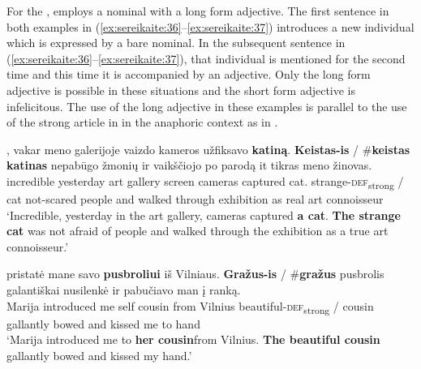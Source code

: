 \documentclass[output=paper,
modfonts
]{langscibook}
\begin{document}
For the ,  employs a nominal with a long form adjective. The first sentence in both examples in (\ref{ex:sereikaite:36}--\ref{ex:sereikaite:37}) introduces a new individual which is expressed by a bare nominal. In the subsequent sentence in (\ref{ex:sereikaite:36}--\ref{ex:sereikaite:37}), that individual is mentioned for the second time and this time it is accompanied by an adjective. Only the long form adjective is possible in these situations and the short form adjective is infelicitous. The use of the long adjective in these examples is parallel to the use of the strong article in  in the anaphoric context as in . 

\begin{exe}
	\ex \label{ex:sereikaite:36}
	, {vakar} {meno} {galerijoje} {vaizdo} {kameros} {užfiksavo} {\textbf{katiną}}. \textbf{Keistas-is} \textnormal{/} \textnormal{\#}\textbf{keistas} {\textbf{katinas}} {nepabūgo} {žmonių} {ir} {vaikščiojo} {po} {parodą} {it} {tikras} {meno} {žinovas}. \\
	incredible yesterday art gallery screen cameras captured {cat}. {strange-\textsc{def}\textsubscript{strong}} /  {cat} not-scared people and walked through exhibition as real art connoisseur\\
	\trans `Incredible, yesterday in the art gallery, cameras captured \textbf{a cat}. \textbf{The strange cat} was not afraid of people and walked through the exhibition as a true art connoisseur.' 
\end{exe}

\begin{exe}
	\ex \label{ex:sereikaite:37}
	 {pristatė} {mane} {savo} {\textbf{pusbroliui}} {iš} {Vilniaus}. \textbf{Gražus-is} \textnormal{/} \textnormal{\#}\textbf{gražus} {pusbrolis} {galantiškai} {nusilenkė} {ir} {pabučiavo} {man} {į} {ranką}.\\
	Marija introduced me self {cousin} from Vilnius {beautiful-\textsc{def}\textsubscript{strong}} /  cousin gallantly bowed and kissed me to hand \\
	\trans `Marija introduced me to \textbf{her cousin}\largerpage from Vilnius. \textbf{The beautiful cousin} gallantly bowed and kissed my hand.'
\end{exe}
\end{document}
